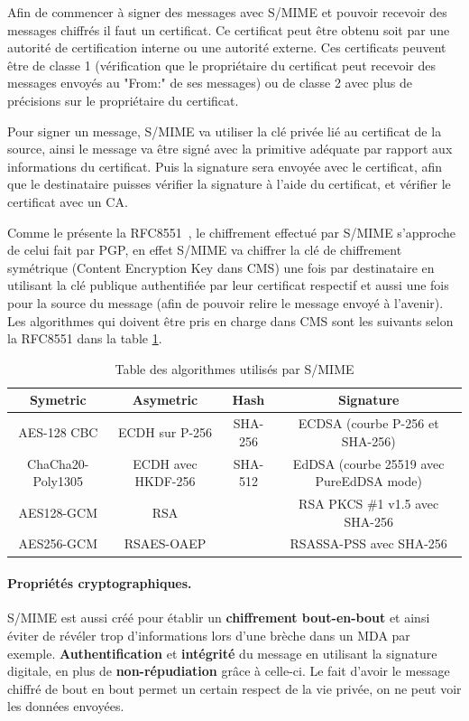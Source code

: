 Afin de commencer à signer des messages avec S/MIME et pouvoir recevoir des messages chiffrés il faut un certificat. Ce certificat peut être obtenu soit par une autorité de certification interne ou une autorité externe. Ces certificats peuvent être de classe 1 (vérification que le propriétaire du certificat peut recevoir des messages envoyés au "From:" de ses messages) ou de classe 2 avec plus de précisions sur le propriétaire du certificat.

Pour signer un message, S/MIME va utiliser la clé privée lié au certificat de la source, ainsi le message va être signé avec la primitive adéquate par rapport aux informations du certificat. Puis la signature sera envoyée avec le certificat, afin que le destinataire puisses vérifier la signature à l'aide du certificat, et vérifier le certificat avec un CA.

Comme le présente la RFC8551~\cite{RFC8551}, le chiffrement effectué par S/MIME s'approche de celui fait par PGP, en effet S/MIME va chiffrer la clé de chiffrement symétrique (Content Encryption Key dans CMS) une fois par destinataire en utilisant la clé publique authentifiée par leur certificat respectif et aussi une fois pour la source du message (afin de pouvoir relire le message envoyé à l'avenir). Les algorithmes qui doivent être pris en charge dans CMS sont les suivants selon la RFC8551 dans la table \ref{table:refSMIMEAlgos}.

\begin{table}[h!]
	\centering
	\caption{Table des algorithmes utilisés par S/MIME}
	\label{table:refSMIMEAlgos}
	\begin{adjustbox}{width=\textwidth}
		\begin{tabular}{||c c c c||}
			\hline
			Symetric & Asymetric & Hash & Signature \\ [0.5ex]
			\hline\hline
			AES-128 CBC & ECDH sur P-256 & SHA-256 & ECDSA (courbe P-256 et SHA-256) \\
			ChaCha20-Poly1305 & ECDH  avec HKDF-256 & SHA-512 & EdDSA (courbe 25519 avec PureEdDSA mode) \\
			AES128-GCM & RSA & & RSA PKCS \#1 v1.5 avec SHA-256 \\
			AES256-GCM & RSAES-OAEP & & RSASSA-PSS avec SHA-256\\
			\hline
		\end{tabular}
	\end{adjustbox}
	
\end{table}
\paragraph*{Propriétés cryptographiques.}
S/MIME est aussi créé pour établir un \textbf{chiffrement bout-en-bout} et ainsi éviter de révéler trop d'informations lors d'une brèche dans un MDA par exemple. 
\textbf{Authentification} et \textbf{intégrité} du message en utilisant la signature digitale, en plus de \textbf{non-répudiation} grâce à celle-ci. Le fait d'avoir le message chiffré de bout en bout permet un certain respect de la vie privée, on ne peut voir les données envoyées.
